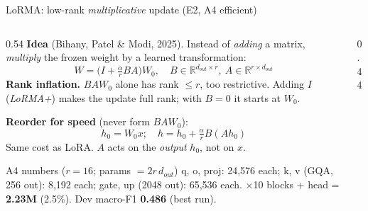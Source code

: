 \documentclass[aspectratio=169,11pt]{beamer}
\begin{document}
\begin{frame}{LoRMA: low-rank \emph{multiplicative} update (E2, A4 efficient)}
  \begin{columns}[T]
    \begin{column}{0.54\textwidth}
      \scriptsize
      \textbf{Idea} (Bihany, Patel \& Modi, 2025). Instead of \emph{adding} a matrix,
      \emph{multiply} the frozen weight by a learned transformation:
      $$W = \Big(I + \tfrac{\alpha}{r} BA\Big) W_0,\quad B\in\mathbb{R}^{d_{out}\times r},\ A\in\mathbb{R}^{r\times d_{out}}$$
      \textbf{Rank inflation.} $BAW_0$ alone has rank $\le r$, too restrictive.
      Adding $I$ (\emph{LoRMA+}) makes the update full rank; with $B=0$ it starts at $W_0$.
      \vspace{1mm}

      \textbf{Reorder for speed} (never form $BAW_0$):
      $$h_0 = W_0x;\quad h = h_0 + \tfrac{\alpha}{r} B(A h_0)$$
      Same cost as LoRA. $A$ acts on the \emph{output} $h_0$, not on $x$.
      \begin{exampleblock}{A4 numbers ($r=16$; params $= 2 r\, d_{out}$)}
        \scriptsize q, o, proj: 24{,}576 each; k, v (GQA, 256 out): 8{,}192 each; gate, up (2048 out): 65{,}536 each.
        $\times$10 blocks + head = \textbf{2.23M} (2.5\%). Dev macro-F1 \textbf{0.486} (best run).
      \end{exampleblock}
    \end{column}
    \begin{column}{0.44\textwidth}
      \begin{center}
      \end{center}
    \end{column}
  \end{columns}
\end{frame}
\end{document}
